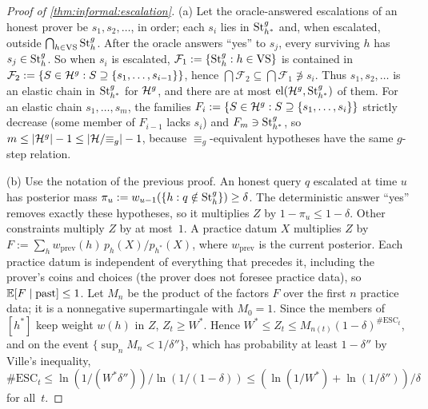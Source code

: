 \begin{proof}[Proof of \cref{thm:informal:escalation}]
(a) Let the oracle-answered escalations of an honest prover be $s_1,s_2,\dots$, in order; each $s_i$ lies in $\mathrm{St}^{g}_{h^*}$ and, when escalated, outside $\bigcap_{h\in\mathrm{VS}}\mathrm{St}^{g}_{h}$. After the oracle answers ``yes'' to $s_j$, every surviving $h$ has $s_j\in\mathrm{St}^{g}_{h}$. So when $s_i$ is escalated, $\mathcal F_1:=\{\mathrm{St}^{g}_{h}:h\in\mathrm{VS}\}$ is contained in $\mathcal F_2:=\{S\in\mathcal{H}^g:S\supseteq\{s_1,\dots,s_{i-1}\}\}$, hence $\bigcap\mathcal F_2\subseteq\bigcap\mathcal F_1\not\ni s_i$. Thus $s_1,s_2,\dots$ is an elastic chain in $\mathrm{St}^{g}_{h^*}$ for $\mathcal{H}^g$, and there are at most $\mathrm{el}(\mathcal{H}^g,\mathrm{St}^{g}_{h^*})$ of them. For an elastic chain $s_1,\dots,s_m$, the families $F_i:=\{S\in\mathcal{H}^g:S\supseteq\{s_1,\dots,s_i\}\}$ strictly decrease (some member of $F_{i-1}$ lacks $s_i$) and $F_m\ni\mathrm{St}^{g}_{h^*}$, so $m\le|\mathcal{H}^g|-1\le|\mathcal{H}/{\equiv_g}|-1$, because $\equiv_g$-equivalent hypotheses have the same $g$-step relation.

(b) Use the notation of the previous proof. An honest query $q$ escalated at time $u$ has posterior mass $\pi_u:=w_{u-1}(\{h:q\notin\mathrm{St}^{g}_{h}\})\ge\delta$. The deterministic answer ``yes'' removes exactly these hypotheses, so it multiplies $Z$ by $1-\pi_u\le1-\delta$. Other constraints multiply $Z$ by at most~$1$. A practice datum $X$ multiplies $Z$ by $F:=\sum_hw_{\mathrm{prev}}(h)\,p_h(X)/p_{h^*}(X)$, where $w_{\mathrm{prev}}$ is the current posterior. Each practice datum is independent of everything that precedes it, including the prover's coins and choices (the prover does not foresee practice data), so $\mathbb{E}[F\mid\text{past}]\le1$. Let $M_n$ be the product of the factors $F$ over the first $n$ practice data; it is a nonnegative supermartingale with $M_0=1$. Since the members of $[h^*]$ keep weight $w(h)$ in $Z$, $Z_t\ge W^*$. Hence $W^*\le Z_t\le M_{n(t)}(1-\delta)^{\#\mathrm{ESC}_t}$, and on the event $\{\sup_nM_n<1/\delta''\}$, which has probability at least $1-\delta''$ by Ville's inequality, $\#\mathrm{ESC}_t\le\ln(1/(W^*\delta''))/\ln(1/(1-\delta))\le(\ln(1/W^*)+\ln(1/\delta''))/\delta$ for all~$t$.


\end{proof}
